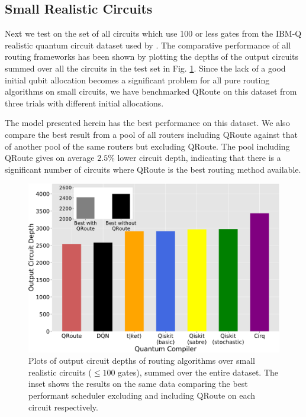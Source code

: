 \subsection{\label{sec:results-small}Small Realistic Circuits}

Next we test on the set of all circuits which use 100 or less gates from the IBM-Q realistic quantum circuit dataset used by \cite{data_realistic}. The comparative performance of all routing frameworks has been shown by plotting the depths of the output circuits summed over all the circuits in the test set in Fig. \ref{fig:results-small}. Since the lack of a good initial qubit allocation becomes a significant problem for all pure routing algorithms on small circuits, we have benchmarked QRoute on this dataset from three trials with different initial allocations.

The model presented herein has the best performance on this dataset. We also compare the best result from a pool of all routers including QRoute against that of another pool of the same routers but excluding QRoute. The pool including QRoute gives on average $2.5\%$ lower circuit depth, indicating that there is a significant number of circuits where QRoute is the best routing method available.

\begin{figure}[t]
    \includegraphics[width=\linewidth]{figures/qroute/realistic_small_benchmark.pdf}
    \caption[qRoute Results on small realistic circuit set]{\label{fig:results-small}
        Plots of output circuit depths of routing algorithms over small realistic circuits ($\leq 100$ gates), summed over the entire dataset. The inset shows the results on the same data comparing the best performant scheduler excluding and including QRoute on each circuit respectively.}
\end{figure}



